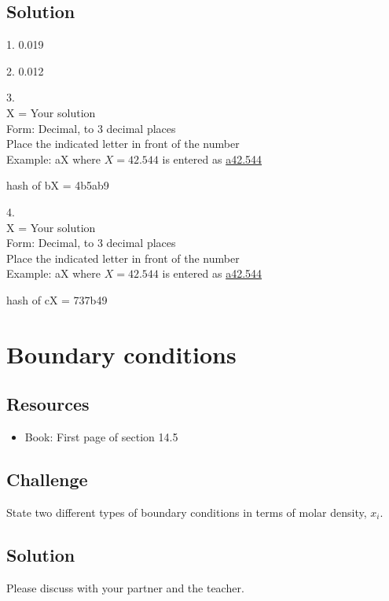 \subsection*{Solution}
1. \num{0.019}

2. \num{0.012}

3.\\
X = Your solution\\
Form: Decimal, to 3 decimal places\\
Place the indicated letter in front of the number\\
Example: aX where $X=42.544$ is entered as \href{http://www.wolframalpha.com/input/?i=md5+hash+of+\%22a42.544\%22}{a42.544}

hash of bX = 4b5ab9

4.\\
X = Your solution\\
Form: Decimal, to 3 decimal places\\
Place the indicated letter in front of the number\\
Example: aX where $X=42.544$ is entered as \href{http://www.wolframalpha.com/input/?i=md5+hash+of+\%22a42.544\%22}{a42.544}

hash of cX = 737b49




\newpage
\section{Boundary conditions}

\subsection*{Resources}
\begin{itemize}
    \item Book: First page of section 14.5
\end{itemize}

\subsection*{Challenge}
State two different types of boundary conditions in terms of molar density, $x_i$.

\subsection*{Solution}
Please discuss with your partner and the teacher.





